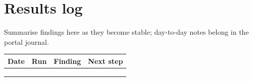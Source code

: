 \documentclass[11pt,a4paper]{article}
\begin{document}
\section{Results log}
\label{sec:log}
Summarise findings here as they become stable; day-to-day notes belong in the portal journal.

\begin{table}[h]
\centering\small
\begin{tabularx}{\linewidth}{@{}l l >{\raggedright}X >{\raggedright\arraybackslash}X@{}}
\toprule
Date & Run & Finding & Next step \\
\midrule
 & & & \\
 & & & \\
 & & & \\
\bottomrule
\end{tabularx}
\end{table}



\end{document}
